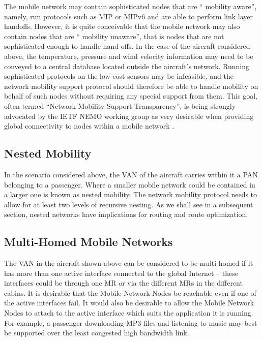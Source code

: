 The mobile network may contain sophisticated nodes that are \textquotedblleft
mobility aware\textquotedblright, namely, run protocols such as MIP or MIPv6
and are able to perform link layer handoffs. However, it is quite conceivable
that the mobile network may also contain nodes that are \textquotedblleft
mobility unaware\textquotedblright, that is nodes that are not sophisticated
enough to handle hand-offs. In the case of the aircraft considered above, the
temperature, pressure and wind velocity information may need to be conveyed to
a central database located outside the aircraft's network. Running
sophisticated protocols on the low-cost sensors may be infeasible, and the
network mobility support protocol should therefore be able to handle mobility
on behalf of such nodes without requiring any special support from them. This
goal, often termed \textquotedblleft Network Mobility Support
Transparency\textquotedblright, is being strongly advocated by the IETF NEMO
working group as very desirable when providing global connectivity to nodes
within a mobile network \cite{7}.

\subsection{Nested Mobility}

In the scenario considered above, the VAN of the aircraft carries within it a
PAN belonging to a passenger. Where a smaller mobile network could be
contained in a larger one is known as nested mobility. The network mobility
protocol needs to allow for at least two levels of recursive nesting.
As we shall see in a subsequent section, nested networks have implications for
routing and route optimization.

\subsection{Multi-Homed Mobile Networks}

The VAN in the aircraft shown above can be considered to be multi-homed if it
has more than one active interface connected to the global Internet -- these
interfaces could be through one MR or via the different MRs in the different
cabins. It is desirable that the Mobile Network Nodes be reachable even if one
of the active interfaces fail. It would also be desirable to allow the Mobile
Network Nodes to attach to the active interface which suits the application it
is running. For example, a passenger downloading MP3 files and listening to
music may best be supported over the least congested high bandwidth link.

